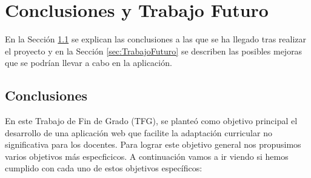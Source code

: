 \chapter{Conclusiones y Trabajo Futuro}
\label{cap:conclusiones}

En la Sección \ref{sec:conclusiones} se explican las conclusiones a las que se ha llegado tras realizar el proyecto y en la Sección \ref{sec:TrabajoFuturo} se describen las posibles mejoras que se podrían llevar a cabo en la aplicación.

\section{Conclusiones}
\label{sec:conclusiones}
En este Trabajo de Fin de Grado (TFG), se planteó como objetivo principal el desarrollo de una aplicación web que facilite la adaptación curricular no significativa para los docentes. Para lograr este objetivo general nos propusimos varios objetivos más especficicos. A continuación vamos a ir viendo si hemos cumplido con cada uno de estos objetivos específicos:

